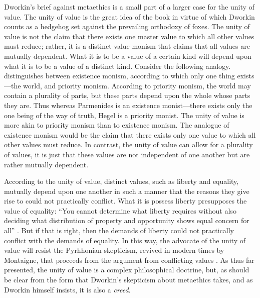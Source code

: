 \documentclass[12pt]{article}
\begin{document}
Dworkin's brief against metaethics is a small part of a larger case for the unity of value. The unity of value is the great idea of the book in virtue of which Dworkin counts as a hedgehog set against the prevailing orthodoxy of foxes. The unity of value is not the claim that there exists one master value to which all other values must reduce; rather, it is a distinct value monism that claims that all values are mutually dependent. What it is to be a value of a certain kind will depend upon what it is to be a value of a distinct kind. Consider the following analogy. \citet{Schaffer:2007ma,Schaffer:2008ks,Schaffer:2009vn,Schaffer:2010ja} distinguishes between existence monism, according to which only one thing exists---the world, and priority monism. According to priority monism, the world may contain a plurality of parts, but these parts depend upon the whole whose parts they are. Thus whereas Parmenides is an existence monist---there exists only the one being of the way of truth, Hegel is a priority monist. The unity of value is more akin to priority monism than to existence monism. The analogue of existence monism would be the claim that there exists only one value to which all other values must reduce. In contrast, the unity of value can allow for a plurality of values, it is just that these values are not independent of one another but are rather mutually dependent.

According to the unity of value, distinct values, such as liberty and equality, mutually depend upon one another in such a manner that the reasons they give rise to could not practically conflict. What it is possess liberty presupposes the value of equality: ``You cannot determine what liberty requires without also deciding what distribution of property and opportunity shows equal concern for all'' \citep[4]{Dworkin:2011fk}. But if that is right, then the demands of liberty could not practically conflict with the demands of equality. In this way, the advocate of the unity of value will resist the Pyrhhonian skepticism, revived in modern times by Montaigne, that proceeds from the argument from conflicting values \citep[for a useful to discussion of such argument forms see][]{Annas:1985fk}. As thus far presented, the unity of value is a complex philosophical doctrine, but, as should be clear from the form that Dworkin's skepticism about metaethics takes, and as Dworkin himself insists, it is also a \emph{creed}.
\end{document}
